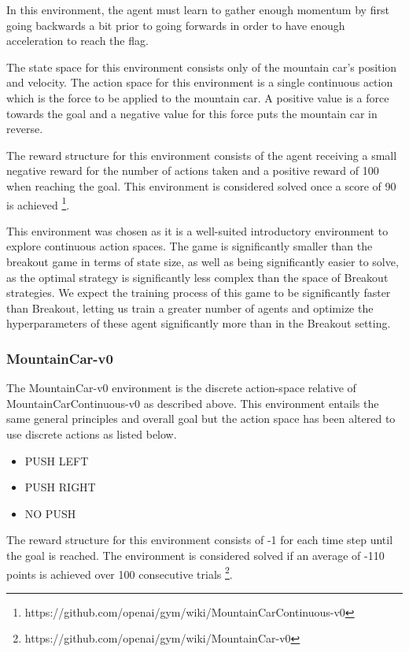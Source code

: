 \documentclass[conference]{IEEEtran}
\begin{document}
In this environment, the agent must learn to gather enough momentum by first going backwards a bit prior to going forwards in order to have enough acceleration to reach the flag.

The state space for this environment consists only of the mountain car's position and velocity.
The action space for this environment is a single continuous action which is the force to be applied to the mountain car.
A positive value is a force towards the goal and a negative value for this force puts the mountain car in reverse.

The reward structure for this environment consists of the agent receiving a small negative reward for the number of actions taken and a positive reward of 100 when reaching the goal.
This environment is considered solved once a score of 90 is achieved \footnote{https://github.com/openai/gym/wiki/MountainCarContinuous-v0}.

This environment was chosen as it is a well-suited introductory environment to explore continuous action spaces.
The game is significantly smaller than the breakout game in terms of state size, as well as being significantly easier to solve, as the optimal strategy is significantly less complex than the space of Breakout strategies.
We expect the training process of this game to be significantly faster than Breakout, letting us train a greater number of agents and optimize the hyperparameters of these agent significantly more than in the Breakout setting.

\subsubsection{MountainCar-v0}
The MountainCar-v0 environment is the discrete action-space relative of MountainCarContinuous-v0 as described above.
This environment entails the same general principles and overall goal but the action space has been altered to use discrete actions as listed below.

\begin{itemize}
    \item PUSH LEFT
    \item PUSH RIGHT
    \item NO PUSH
\end{itemize}

The reward structure for this environment consists of -1 for each time step until the goal is reached.
The environment is considered solved if an average of -110 points is achieved over 100 consecutive trials \footnote{https://github.com/openai/gym/wiki/MountainCar-v0}.
\end{document}
